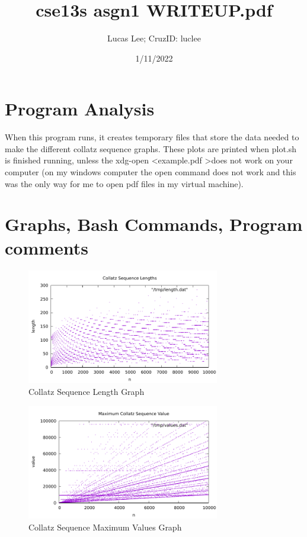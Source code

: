 \documentclass[11pt]{article}
\begin{document}
\title {cse13s asgn1 WRITEUP.pdf}
\author{Lucas Lee; CruzID: luclee}
\date {1/11/2022}
\maketitle
\section{Program Analysis}\label{ss:analysis}
When this program runs, it creates temporary files that store the data needed to make the different collatz sequence graphs. These plots are printed when plot.sh is finished running, unless the xdg-open \textless example.pdf \textgreater does not work on your computer (on my windows computer the open command does not work and this was the only way for me to open pdf files in my virtual machine).

\section{Graphs, Bash Commands, Program comments}\label{ss:misc}
\begin{figure}[h]
\begin{centering}
\includegraphics[width=0.75\textwidth]{fig/length.pdf}
\caption{Collatz Sequence Length Graph}\label{fig:1}
\end{centering}
\end{figure}

\begin{figure}[h]
\begin{centering}
\includegraphics[width=0.75\textwidth]{fig/values.pdf}
\caption{Collatz Sequence Maximum Values Graph}\label{fig:2}
\end{centering}
\end{figure}
\end{document}
